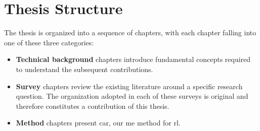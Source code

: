 \section{Thesis Structure}
\label{sec:introduction_thesis_structure}



The thesis is organized into a sequence of chapters, with each chapter falling into one of these three categories:
\begin{itemize}
\item[] \textcolor{myblue}{\textbf{Technical background}} chapters introduce fundamental concepts required to understand the subsequent contributions.
\item[] \textcolor{mygreen}{\textbf{Survey}} chapters review the existing literature around a specific research question.
The organization adopted in each of these surveys is original and therefore constitutes a contribution of this thesis.
\item[] \textcolor{myred}{\textbf{Method}} chapters present \gls{car}, our \gls{me} method for \gls{rl}.
\end{itemize}

